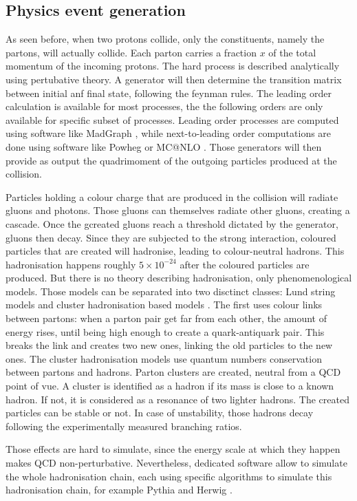 \subsection{Physics event generation} 
\label{sec:cms_physics_event_generation}

As seen before, when two protons collide, only the constituents, namely the partons, will actually collide. Each parton carries a fraction $x$ of the total momentum of the incoming protons. The hard process is described analytically using pertubative theory. A generator will then determine the transition matrix between initial anf final state, following the feynman rules. The leading order calculation is available for most processes, the the following orders are only available for specific subset of processes. Leading order processes are computed using software like MadGraph \cite{}, while next-to-leading order computations are done using software like Powheg \cite{} or MC@NLO \cite{}.
Those generators will then provide as output the quadrimoment of the outgoing particles produced at the collision.

Particles holding a colour charge that are produced in the collision will radiate gluons and photons. Those gluons can themselves radiate other gluons, creating a cascade. Once the gcreated gluons reach a threshold dictated by the generator, gluons then decay. Since they are subjected to the strong interaction, coloured particles that are created will hadronise, leading to colour-neutral hadrons. This hadronisation happens roughly $5 \times 10^{-24}$ after the coloured particles are produced. But there is no theory describing hadronisation, only phenomenological models. Those models can be separated into two disctinct classes: Lund string models \cite{} and cluster hadronisation based models \cite{}. The first uses colour links between partons: when a parton pair get far from each other, the amount of energy rises, until being high enough to create a quark-antiquark pair. This breaks the link and creates two new ones, linking the old particles to the new ones. The cluster hadronisation models use quantum numbers conservation between partons and hadrons.  Parton clusters are created, neutral from a QCD point of vue. A cluster is identified as a hadron if its mass is close to a known hadron. If not, it is considered as a resonance of two lighter hadrons. The created particles can be stable or not. In case of unstability, those hadrons decay following the experimentally measured branching ratios.

Those effects are hard to simulate, since the energy scale at which they happen makes QCD non-perturbative. Nevertheless, dedicated software allow to simulate the whole hadronisation chain, each using specific algorithms to simulate this hadronisation chain, for example Pythia \cite{} and Herwig \cite{}.

